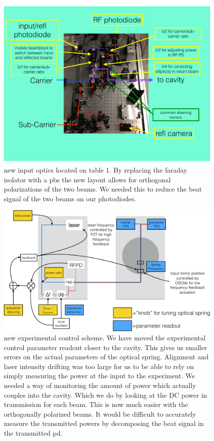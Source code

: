 \begin{figure}
\centering
  \includegraphics[width=15cm]{./figures/newinput.pdf}
  \caption[New Table 1 Input Optics]{
    new input optics located on table 1.
    By replacing the faraday isolator with a \ac{pbs}
    the new layout allows for orthogonal polarizations of the two beams.
    We needed this to reduce the beat signal of the two beams on our
    photodiodes.
    }
  \label{fig:newinput}
\end{figure}

\begin{figure}
\centering
  \includegraphics[width=15cm]{./figures/trapcontrol2.pdf}
  \caption[New Experimental Control Scheme]{
    new experimental control scheme.
    We have moved the experimental control parameter readout closer to the
    cavity.
    This gives us smaller errors on the actual parameters of the optical
    spring.
    Alignment and laser intensity drifting was too large for us to be able to
    rely on simply measuring the power at the input to the experiment.
    We needed a way of monitoring the amount of power which actually couples
    into the cavity.
    Which we do by looking at the DC power in transmission for each beam.
    This is now much easier with the orthogonally polarized beams.
    It would be difficult to accurately measure the transmitted powers
    by decomposing the beat signal in the transmitted \ac{pd}.
    }
  \label{fig:trapcontrol2}
\end{figure}



